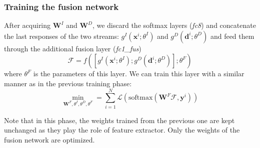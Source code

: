 \subsubsection{Training the fusion network}
After acquiring $\mathbf{W}^I$ and $\mathbf{W}^D$, we discard the softmax layers (\textit{fc8}) and concatenate the last responses of the two streams: $g^I(\mathbf{x}^i; \theta^I)$ and $g^D(\mathbf{d}^i; \theta^D)$ and feed them through the additional fusion layer (\textit{fc1\_fus})
\begin{equation}
	\mathcal{F} = f\left(\left[g^I(\mathbf{x}^i; \theta^I); g^D(\mathbf{d}^i; \theta^D)\right]; \theta^F\right)
\end{equation}
where $\theta^F$ is the parameters of this layer. We can train this layer with a similar manner as in the previous training phase:
\begin{equation}
	\min_{\mathbf{W}^F,\theta^I, \theta^D, \theta^F} = \sum_{i=1}^N \mathcal{L} \left( \text{softmax}\left(\mathbf{W}^F \mathcal{F}, \mathbf{y}^i\right)\right)
\end{equation}

Note that in this phase, the weights trained from the previous one are kept unchanged as they play the role of feature extractor. Only the weights of the fusion network are optimized. 